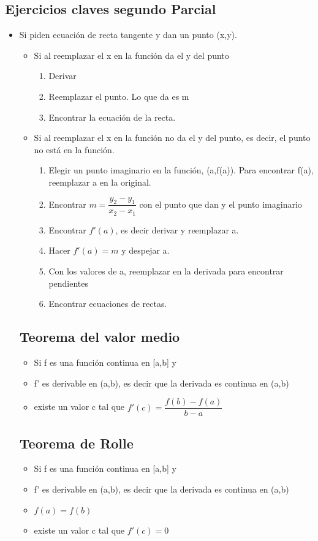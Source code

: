 \subsection{Ejercicios claves segundo Parcial}


\begin{itemize}
	\item Si piden ecuación de recta tangente y dan un punto (x,y).
	\begin{itemize}
		\item Si al reemplazar el x en la función da el y del punto
		\begin{enumerate}
			\item Derivar
			\item Reemplazar el punto. Lo que da es m
			\item Encontrar la ecuación de la recta.
		\end{enumerate}
	\item Si al reemplazar el x en la función no da el y del punto, es decir, el punto no está en la función.
	\begin{enumerate}
		\item Elegir un punto imaginario en la función, (a,f(a)). Para encontrar f(a), reemplazar a en la original.
		\item Encontrar $m=\dfrac{y_2-y_1}{x_2-x_1}$ con el punto que dan y el punto imaginario
		\item Encontrar $f'(a)$, es decir derivar y reemplazar a.
		\item Hacer $f'(a)=m$ y despejar a.
		\item Con los valores de a, reemplazar en la derivada para encontrar pendientes
		\item Encontrar ecuaciones de rectas.
	\end{enumerate}
	\end{itemize}
	
	\subsection{Teorema del valor medio}
	\begin{itemize}
		\item Si f es una función continua en [a,b] y
		\item f' es derivable en (a,b), es decir que la derivada es continua en (a,b)
		\item existe un valor c tal que $f'(c)=\dfrac{f(b)-f(a)}{b-a}$
	\end{itemize}
	\subsection{Teorema de Rolle}
	\begin{itemize}
		\item Si f es una función continua en [a,b] y
		\item f' es derivable en (a,b), es decir que la derivada es continua en (a,b)
		\item $f(a)=f(b)$
		\item existe un valor c tal que $f'(c)=0$
	\end{itemize}

\end{itemize}
